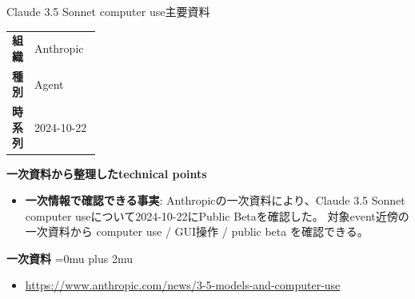 \begin{technicalnote}{Claude 3.5 Sonnet computer use}{主要資料}
\begingroup
\begin{tabularx}{\linewidth}{@{}>{\bfseries}p{0.22\linewidth}X@{}}
組織 & Anthropic \\
種別 & Agent \\
時系列 & 2024-10-22 \\
\end{tabularx}
\smallskip
{\bfseries 一次資料から整理したtechnical points}
\begin{itemize}[leftmargin=1.5em,itemsep=0.35em]
\item \textbf{一次情報で確認できる事実}: Anthropicの一次資料により、Claude 3.5 Sonnet computer useについて2024-10-22にPublic Betaを確認した。 対象event近傍の一次資料から computer use / GUI操作 / public beta を確認できる。
\end{itemize}
\begin{minipage}{\linewidth}
\begin{samepage}
{\bfseries 一次資料}
\begingroup\sloppy
\Urlmuskip=0mu plus 2mu\relax
\begin{itemize}[leftmargin=1.5em,itemsep=0.25em]
\item {\scriptsize\url{https://www.anthropic.com/news/3-5-models-and-computer-use}}
\end{itemize}
\endgroup
\end{samepage}
\end{minipage}
\endgroup
\end{technicalnote}
\medskip

